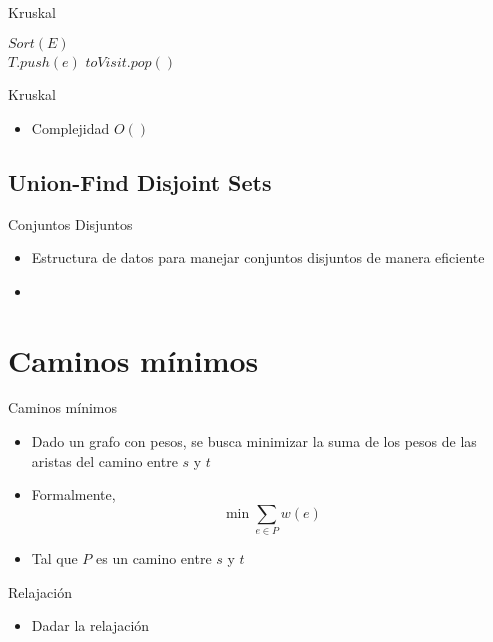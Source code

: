 \documentclass[]{beamer}
\begin{document}
\begin{frame}{Kruskal}
  \begin{algorithm}[H]
    {$Sort(E)$} \\
    {
      {
        {$ T.push(e)  $}
      }
      { $toVisit.pop()$ }
    }
  \end{algorithm}
\end{frame}

\begin{frame}{Kruskal}
  \begin{itemize}
    \item Complejidad $O()$
  \end{itemize}
\end{frame}

\subsection{Union-Find Disjoint Sets}
\begin{frame}{Conjuntos Disjuntos}
  \begin{itemize}
    \item Estructura de datos para manejar conjuntos disjuntos de manera eficiente
      \pause
    \item 
  \end{itemize}
\end{frame}

\section{Caminos m\'inimos}
\begin{frame}{Caminos m\'inimos}
  \begin{itemize}
    \item Dado un grafo con pesos, se busca minimizar la suma de los pesos de las aristas del camino entre $s$ y $t$
      \pause
    \item Formalmente, $$ \min \sum_{e \in P} w(e)$$
      \pause
    \item Tal que $P$ es un camino entre $s$ y $t$
  \end{itemize}
\end{frame}

\begin{frame}{Relajaci\'on}
  \begin{itemize}
    \item Dadar la relajaci\'on
  \end{itemize}
\end{frame}
\end{document}
